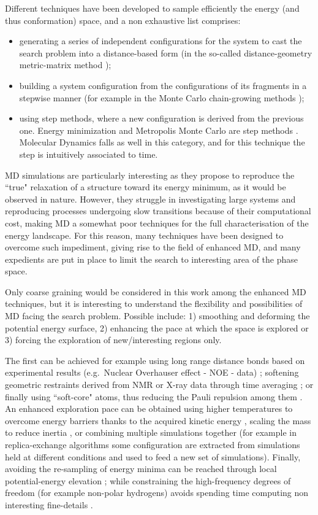 Different techniques have been developed to sample efficiently the energy (and thus conformation) space, and a non exhaustive list comprises:
\begin{itemize}
\item generating a series of independent configurations for the system to cast the search problem into a distance-based form (in the so-called distance-geometry metric-matrix method \cite{Crippen1988,Havel1990});
\item building a system configuration from the configurations of its fragments in a stepwise manner (for example in the Monte Carlo chain-growing methods \cite{Velikson1992});
\item using step methods, where a new configuration is derived from the previous one. Energy minimization and Metropolis Monte Carlo are step methods \cite{vanGunsteren1997}. Molecular Dynamics falls as well in this category, and for this technique the step is intuitively associated to time.
\end{itemize}
MD simulations are particularly interesting as they propose to reproduce the ``true" relaxation of a structure toward its energy minimum, as it would be observed in nature. However, they struggle in investigating large systems and reproducing processes undergoing slow transitions because of their computational cost, making MD a somewhat poor techniques for the full characterisation of the energy landscape.
%
For this reason, many techniques have been designed to overcome such impediment, giving rise to the field of enhanced MD, and many expedients are put in place to limit the search to interesting area of the phase space.

Only coarse graining would be considered in this work among the enhanced MD techniques, but it is interesting to understand the flexibility and possibilities of MD facing the search problem. Possible include: 1) smoothing and deforming the potential energy surface, 2) enhancing the pace at which the space is explored or 3) forcing the exploration of new/interesting regions only.

The first can be achieved for example using long range distance bonds based on experimental results (e.g.\ Nuclear Overhauser effect - NOE - data) \cite{Braun1985}; softening geometric restraints derived from NMR or X-ray data through time averaging \cite{Torda1990}; or finally using ``soft-core" atoms, thus reducing the Pauli repulsion among them \cite{Huber1997}.
%
An enhanced exploration pace can be obtained using higher temperatures to overcome energy barriers thanks to the acquired kinetic energy \cite{Kirkpatrick1983}, scaling the mass to reduce inertia \cite{Mao1990}, or combining multiple simulations together (for example in replica-exchange algorithms \cite{Okamoto2004} some configuration are extracted from simulations held at different conditions and used to feed a new set of simulations).
%
Finally, avoiding the re-sampling of energy minima can be reached through local potential-energy elevation \cite{Huber1994,Laio2002}; while constraining the high-frequency degrees of freedom (for example non-polar hydrogens) avoids spending time computing non interesting fine-details \cite{vanGunsteren1977}.

